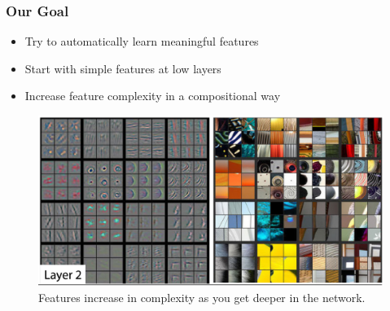 \documentclass[10pt,mathserif]{beamer}
\begin{document}
\begin{frame}
  \frametitle{Our Goal}
  \begin{itemize}
  \item Try to automatically learn meaningful features
  \item Start with simple features at low layers
  \item Increase feature complexity in a compositional way
  \end{itemize}
  \begin{figure}[ht]
    \centering
    \includegraphics[width=0.7\paperwidth]{figure/zf_layer2}
    \caption{Features increase in complexity as you get deeper in the
      network. \label{fig:zf_layer2} }
  \end{figure}
\end{frame}
\end{document}
